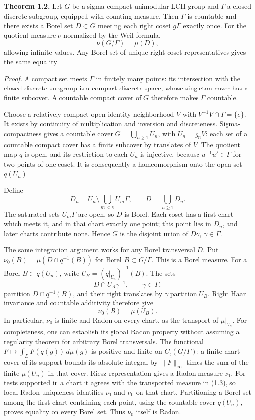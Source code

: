 \documentclass[
  english,
  11pt,
  a4paper,
]{article}
\newcounter{none} %
\begin{document}
\textbf{Theorem 1.2.} Let \(G\) be a sigma-compact unimodular LCH group
and \(\Gamma\) a closed discrete subgroup, equipped with counting
measure. Then \(\Gamma\) is countable and there exists a Borel set
\(D\subset G\) meeting each right coset \(g\Gamma\) exactly once. For
the quotient measure \(\nu\) normalized by the Weil formula,
\[\nu(G/\Gamma)=\mu(D),
\tag{1.2}\] allowing infinite values. Any Borel set of unique
right-coset representatives gives the same equality.

\emph{Proof.} A compact set meets \(\Gamma\) in finitely many points:
its intersection with the closed discrete subgroup is a compact discrete
space, whose singleton cover has a finite subcover. A countable compact
cover of \(G\) therefore makes \(\Gamma\) countable.

Choose a relatively compact open identity neighborhood \(V\) with
\(V^{-1}V\cap\Gamma=\{e\}\). It exists by continuity of multiplication
and inversion and discreteness. Sigma-compactness gives a countable
cover \(G=\bigcup_{n\geq1}U_n\), with \(U_n=g_nV\): each set of a
countable compact cover has a finite subcover by translates of \(V\).
The quotient map \(q\) is open, and its restriction to each \(U_n\) is
injective, because \(u^{-1}u'\in\Gamma\) for two points of one coset. It
is consequently a homeomorphism onto the open set \(q(U_n)\).

Define \[D_n=U_n\setminus\bigcup_{m<n}U_m\Gamma,
\qquad D=\bigcup_{n\geq1}D_n.\] The saturated sets \(U_m\Gamma\) are
open, so \(D\) is Borel. Each coset has a first chart which meets it,
and in that chart exactly one point; this point lies in \(D_n\), and
later charts contribute none. Hence \(G\) is the disjoint union of
\(D\gamma\), \(\gamma\in\Gamma\).

The same integration argument works for any Borel transversal \(D\). Put
\(\nu_0(B)=\mu(D\cap q^{-1}(B))\) for Borel \(B\subset G/\Gamma\). This
is a Borel measure. For a Borel \(B\subset q(U_n)\), write
\(U_B=(q|_{U_n})^{-1}(B)\). The sets
\[D\cap U_B\gamma^{-1},\qquad \gamma\in\Gamma,\] partition
\(D\cap q^{-1}(B)\), and their right translates by \(\gamma\) partition
\(U_B\). Right Haar invariance and countable additivity therefore give
\[\nu_0(B)=\mu(U_B).
\tag{1.3}\] In particular, \(\nu_0\) is finite and Radon on every chart,
as the transport of \(\mu|_{U_n}\). For completeness, one can establish
its global Radon property without assuming a regularity theorem for
arbitrary Borel transversals. The functional
\(F\mapsto\int_DF(q(g))\,d\mu(g)\) is positive and finite on
\(C_c(G/\Gamma)\): a finite chart cover of its support bounds its
absolute integral by \(\|F\|_\infty\) times the sum of the finite
\(\mu(U_n)\) in that cover. Riesz representation gives a Radon measure
\(\nu_1\). For tests supported in a chart it agrees with the transported
measure in (1.3), so local Radon uniqueness identifies \(\nu_1\) and
\(\nu_0\) on that chart. Partitioning a Borel set among the first chart
containing each point, using the countable cover \(q(U_n)\), proves
equality on every Borel set. Thus \(\nu_0\) itself is Radon.
\end{document}
